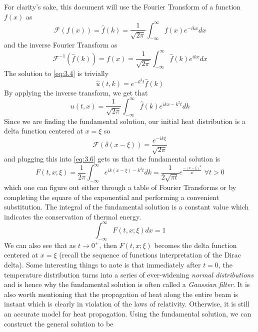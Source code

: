 \documentclass{article}
\numberwithin{equation}{section}
\begin{document}
For clarity's sake, this document will use the Fourier Transform of a function $f(x)$ as
\begin{equation*}
    \mathscr{F}(f(x)) = \hat{f}(k) =\frac{1}{\sqrt{2\pi}}\int^\infty_{-\infty} f(x)e^{-ikx}dx
\end{equation*}
and the inverse Fourier Transform as 
\begin{equation*}
    \mathscr{F}^{-1}(\hat{f}(k)) = f(x)= \frac{1}{\sqrt{2\pi}} \int^\infty_{-\infty} \hat{f}(k)e^{ikx}dx
\end{equation*}
The solution to \eqref{eq:3.4} is trivially 
\begin{equation}
    \hat{u}(t,k) =e^{-k^2t}\hat{f}(k)
\end{equation}
By applying the inverse transform, we get that 
\begin{equation}
    u(t,x) =\frac{1}{\sqrt{2\pi}}\int^\infty_{-\infty}\hat{f}(k)e^{ikx-k^2t} dk \label{eq:3.6}
\end{equation}
Since we are finding the fundamental solution, our initial heat distribution is a delta function centered at $x=\xi$ so 
\begin{equation*}
    \mathscr{F}(\delta(x-\xi)) = \frac{e^{-ik\xi}}{\sqrt{2\pi}}
\end{equation*}
and plugging this into \eqref{eq:3.6} gets us that the fundamental solution is 
\begin{equation}
    F(t,x;\xi) =\frac{1}{2\pi}\int^\infty_{-\infty}e^{ik(x-\xi)-k^2t}dk = \frac{1}{2\sqrt{\pi t}}e^{\frac{-(x-\xi)^2}{4t}} \hspace{4pt} \forall t>0
\end{equation}
which one can figure out either through a table of Fourier Transforms or by completing the square of the exponential and performing a convenient substitution. 
The integral of the fundamental solution is a constant value which indicates the conservation of thermal energy.
\begin{equation*}
    \int^\infty_{-\infty} F(t,x;\xi) dx = 1
\end{equation*}
We can also see that as $t\rightarrow0^+$, then $F(t,x;\xi)$ becomes the delta function centered at $x=\xi$ (recall the sequence of functions interpretation of the Dirac delta). Some interesting things to note is that immediately after $t=0$, the temperature distribution turns into a series of ever-widening \textit{normal distributions} and is hence why the fundamental solution is often called a \textit{Gaussian filter}. It is also worth mentioning that the propagation of heat along the entire beam is instant which is clearly in violation of the laws of relativity. Otherwise, it is still an accurate model for heat propagation. Using the fundamental solution, we can construct the general solution to be 
\end{document}
